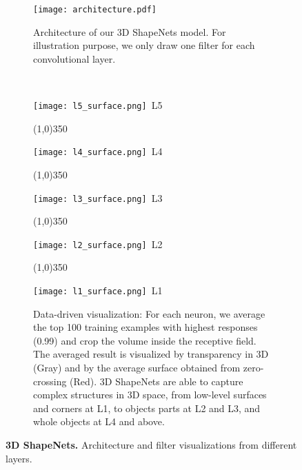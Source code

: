 \documentclass[10pt,twocolumn,letterpaper]{article}
\begin{document}
\begin{figure*}
   \centering
	\begin{subfigure}{0.27\textwidth}
			\centering
             \texttt{[image: architecture.pdf]}
              \caption{Architecture of our 3D ShapeNets model. For illustration purpose, we only draw one filter for each convolutional layer.}
              \label{fig:architecture}
     \end{subfigure}
     ~
	 \begin{subfigure}{0.71\textwidth}
		\centering




		\texttt{[image: l5\_surface.png]}~L5
		
		\vspace{-3mm}\line(1,0){350}
		
		\texttt{[image: l4\_surface.png]}~L4
		
		\vspace{-3mm}\line(1,0){350}
		
		\texttt{[image: l3\_surface.png]}~L3
		
		\vspace{-3mm}\line(1,0){350}
		
		\texttt{[image: l2\_surface.png]}~L2
		
		\vspace{-3mm}\line(1,0){350}
	
	         \texttt{[image: l1\_surface.png]}~L1
             \caption{Data-driven visualization: For each neuron, we average the top 100 training examples with highest responses (0.99) and crop the volume inside the receptive field. The averaged result is visualized by transparency in 3D (Gray) and by the average surface obtained from  zero-crossing (Red). 3D ShapeNets are able to capture complex structures in 3D space,
from low-level surfaces and corners at L1, to objects parts at L2 and L3, and whole objects at L4 and above.}
              \label{fig:filters}
     \end{subfigure}

\vspace{-1mm}
\caption{{\bf 3D ShapeNets.} Architecture and filter visualizations from different layers.}
\label{fig:ShapeNets}
\end{figure*}
\end{document}
